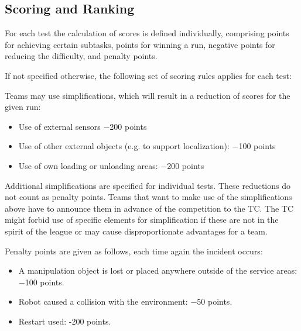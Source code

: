 \subsection{Scoring and Ranking}
For each test the calculation of scores is defined individually, comprising points for achieving certain subtasks, points for winning a run, negative points for reducing the difficulty, and penalty points. 
\par
If not specified otherwise, the following set of scoring rules applies for each test:
\par
Teams may use simplifications, which will result in a reduction of scores for the given run:

\begin{itemize}
	\item Use of external sensors                        −200 points
	\item Use of other external objects (e.g. to support localization):         −100 points
	\item Use of own loading or unloading areas:                 −200 points
\end{itemize}

Additional simplifications are specified for individual tests. These reductions do not count as penalty points. Teams that want to make use of the simplifications above have to announce them in advance of the competition to the TC. The TC might forbid use of specific elements for simplification if these are not in the spirit of the league or may cause disproportionate advantages for a team. 
\par
Penalty points are given as follows, each time again the incident occurs:

\begin{itemize}
	\item A manipulation object is lost or placed anywhere outside of the service areas: −100 points.
	\item Robot caused a collision with the environment: −50 points.
	\item Restart used: -200 points.
\end{itemize}

